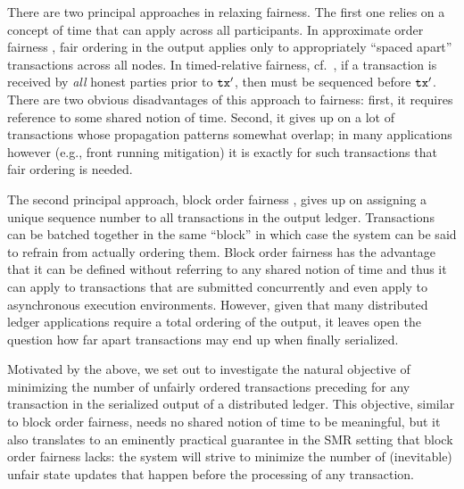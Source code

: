 There are two principal approaches in relaxing fairness.
%
The first one relies on a concept of time that can apply across all participants. In approximate order fairness \cite{C:KZGJ20}, fair ordering in the output applies only to appropriately ``spaced apart'' transactions across all nodes.
%
In timed-relative fairness, cf.~\cite{AFT:Kursawe20,OSDI:ZSCZA20}, if a transaction \tx is received by \emph{all} honest parties prior to $\mathtt{tx}'$, then \tx must be sequenced before $\mathtt{tx}'$.
%
There are two obvious disadvantages of this approach to fairness: first, it requires reference to some shared notion of time.
%
Second, it gives up on a lot of transactions whose propagation patterns somewhat overlap; in many applications however (e.g., front running mitigation) it is exactly for such transactions that fair ordering is needed.

The second principal approach, block order fairness \cite{C:KZGJ20}, gives up on assigning a unique sequence number to all transactions in the output ledger.
%
Transactions can be batched together in the same ``block'' in which case the system can be said to refrain from actually ordering them.
%
Block order fairness has the advantage that it can be defined without referring to any shared notion of time and thus it can apply to transactions that are submitted concurrently and even apply to asynchronous execution environments.
%
However, given that many distributed ledger applications require a total ordering of the output, it leaves open the question how far apart transactions may end up when finally serialized.

Motivated by the above, we set out to investigate the natural objective of minimizing the number of unfairly ordered transactions preceding for any transaction in the serialized output of a distributed ledger.
%
This objective, similar to block order fairness, needs no shared notion of time to be meaningful, but it also translates to an eminently practical guarantee in the SMR setting that block order fairness lacks: the system will strive to minimize the number of (inevitable) unfair state updates that happen before the processing of any transaction.

